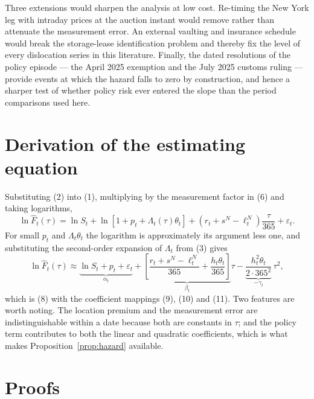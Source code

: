 \documentclass[11pt,a4paper]{article}
\newcommand{\sN}{s^{N}}
\newcommand{\lN}{\ell^{N}_{t}}
\newcommand{\Fhat}{\widehat{F}}
\begin{document}
Three extensions would sharpen the analysis at low cost. Re-timing the New York
leg with intraday prices at the auction instant would remove rather than
attenuate the measurement error. An external vaulting and insurance schedule
would break the storage-lease identification problem and thereby fix the level
of every dislocation series in this literature. Finally, the dated resolutions
of the policy episode --- the April 2025 exemption and the July 2025 customs
ruling --- provide events at which the hazard falls to zero by construction,
and hence a sharper test of whether policy risk ever entered the slope than the
period comparisons used here.

\appendix
\renewcommand{\theequation}{A.\arabic{equation}}
\setcounter{equation}{0}

\section{Derivation of the estimating equation}
\label{app:derivation}

Substituting (2) into (1), multiplying by the measurement factor in (6) and
taking logarithms,
\begin{equation}
\ln \Fhat_t(\tau) = \ln S_t + \ln\!\left[1+p_t+\Lambda_t(\tau)\theta_t\right]
  + \left(r_t+\sN-\lN\right)\frac{\tau}{365} + \varepsilon_t .
\end{equation}
For small $p_t$ and $\Lambda_t\theta_t$ the logarithm is approximately its
argument less one, and substituting the second-order expansion of $\Lambda_t$
from (3) gives
\begin{equation}
\ln \Fhat_t(\tau) \approx \underbrace{\ln S_t + p_t + \varepsilon_t}_{\alpha_t}
  + \underbrace{\left[\frac{r_t+\sN-\lN}{365} + \frac{h_t\theta_t}{365}\right]}_{\beta_t}\tau
  - \underbrace{\frac{h_t^{2}\theta_t}{2\cdot365^{2}}}_{-\gamma_t}\,\tau^{2},
\end{equation}
which is (8) with the coefficient mappings (9), (10) and (11). Two features are
worth noting. The location premium and the measurement error are
indistinguishable within a date because both are constants in $\tau$; and the
policy term contributes to both the linear and quadratic coefficients, which is
what makes Proposition~\ref{prop:hazard} available.

\section{Proofs}
\label{app:proofs}
\end{document}
